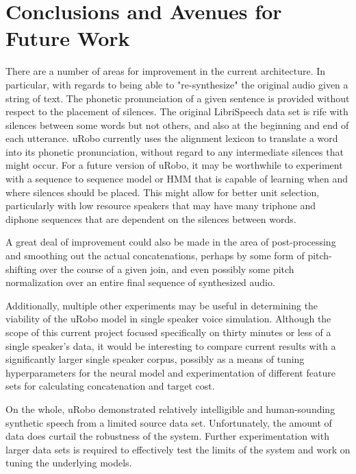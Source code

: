 \documentclass[10pt, journal, compsoc]{IEEEtran}
\begin{document}
\section{Conclusions and Avenues for Future Work}
There are a number of areas for improvement in the current architecture. In particular, with regards to being able to "re-synthesize" the original audio given a string of text. The phonetic pronunciation of a given sentence is provided without respect to the placement of silences. The original LibriSpeech data set is rife with silences between some words but not others, and also at the beginning and end of each utterance. uRobo currently uses the alignment lexicon to translate a word into its phonetic pronunciation, without regard to any intermediate silences that might occur. For a future version of uRobo, it may be worthwhile to experiment with a sequence to sequence model or HMM that is capable of learning when and where silences should be placed. This might allow for better unit selection, particularly with low resource speakers that may have many triphone and diphone sequences that are dependent on the silences between words. \par
A great deal of improvement could also be made in the area of post-processing and smoothing out the actual concatenations, perhaps by some form of pitch-shifting over the course of a given join, and even possibly some pitch normalization over an entire final sequence of synthesized audio.\par
Additionally, multiple other experiments may be useful in determining the viability of the uRobo model in single speaker voice simulation. Although the scope of this current project focused specifically on thirty minutes or less of a single speaker's data, it would be interesting to compare current results with a significantly larger single speaker corpus, possibly as a means of tuning hyperparameters for the neural model and experimentation of different feature sets for calculating concatenation and target cost.\par
On the whole, uRobo demonstrated relatively intelligible and human-sounding synthetic speech from a limited source data set. Unfortunately, the amount of data does curtail the robustness of the system. Further experimentation with larger data sets is required to effectively test the limits of the system and work on tuning the underlying models. 

\end{document}
